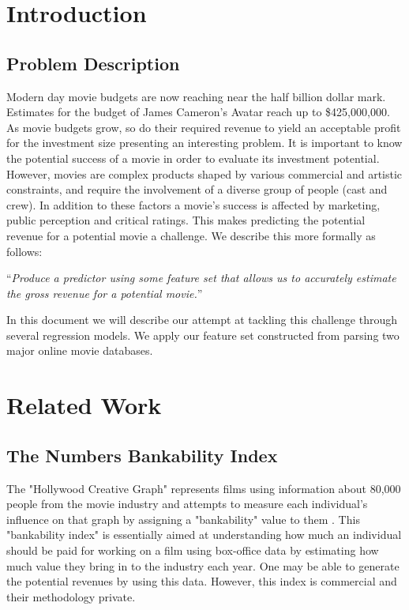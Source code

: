 \documentclass[conference]{IEEEtran}
\begin{document}
\section{Introduction}
\subsection{Problem Description}
Modern day movie budgets are now reaching near the half billion dollar 
mark. Estimates for the budget of James Cameron's Avatar reach up to
\$425,000,000\cite{topmovies}. As movie budgets grow, so do their
required revenue to yield an acceptable profit for the investment size
presenting an interesting problem. It is important to know the potential 
success of a movie in order to evaluate its investment potential. However, 
movies are complex products shaped by various commercial
and artistic constraints, and require the involvement of
a diverse group of people (cast and crew). In addition to these factors 
a movie's success is affected by marketing, public perception 
and critical ratings. This makes predicting the potential 
revenue for a potential movie a challenge. We describe this more formally 
as follows:

 ``\textit{Produce a predictor using some feature set that allows us 
to accurately estimate the gross revenue for a potential movie.}''

In this document we will describe our attempt at tackling this challenge through
several regression models. We apply our feature set constructed from parsing two
major online movie databases.

\section{Related Work}
\subsection{The Numbers Bankability Index}
The "Hollywood Creative Graph" represents films using 
information about 80,000 people from the movie industry 
and attempts to measure each individual's influence 
on that graph by assigning a "bankability" value 
to them \cite{numbersbank}. This "bankability index" 
is essentially aimed at understanding how much an individual 
should be paid for working on a film using box-office data by 
estimating how much value they bring in to the industry each
year. One may be able to generate the potential revenues by using 
this data. However, this index is commercial and their methodology
private.
\end{document}
